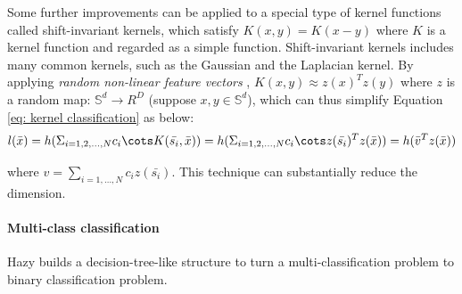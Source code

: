 Some further improvements can be applied to a special type of kernel functions called shift-invariant kernels, which satisfy $K(x, y) = K(x-y)$ where $K$ is a kernel function and regarded as a simple function. Shift-invariant kernels includes many common kernels, such as the Gaussian and the Laplacian kernel. By applying {\em random non-linear feature vectors} \cite{rahimi2008random}, $K(x, y) \approx z(x)^Tz(y)$ where $z$ is a random map: $\mathbb{S}^d \rightarrow R^D$ (suppose $x, y \in \mathbb{S}^d$), which can thus simplify Equation \ref{eq: kernel classification} as below:
\begin{equation}
    l(\bar{x})=h(\Sigma_{i=1,2,\dots,N}c_i\cots K(\bar{s_i}, \bar{x})) = h(\Sigma_{i=1,2,\dots,N}c_i\cots z(\bar{s_i})^Tz(\bar{x}))=h(\bar{v}^Tz(\bar{x}))
\end{equation}

where $v=\sum_{i=1,\dots,N}c_iz(\bar{s_i})$. This technique can substantially reduce the dimension.

\paragraph{Multi-class classification}
Hazy builds a decision-tree-like structure to turn a multi-classification problem to binary classification problem.


